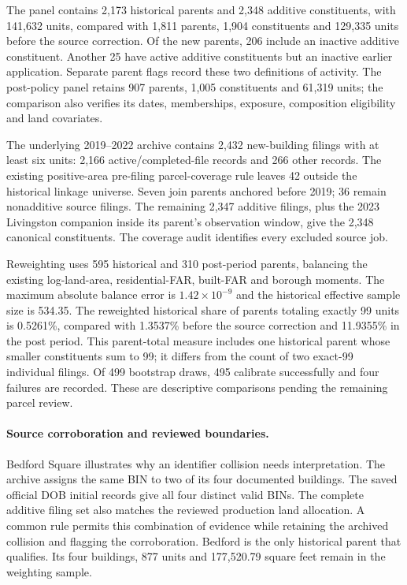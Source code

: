 The panel contains 2,173 historical parents and 2,348 additive constituents,
with 141,632 units, compared with 1,811 parents, 1,904 constituents and
129,335 units before the source correction. Of the new parents, 206 include
an inactive additive constituent. Another 25 have active additive
constituents but an inactive earlier application. Separate parent flags
record these two definitions of activity. The post-policy panel retains
907 parents, 1,005 constituents and 61,319 units; the comparison also verifies
its dates, memberships, exposure, composition eligibility and land covariates.

The underlying 2019--2022 archive contains 2,432 new-building filings with at
least six units: 2,166 active/completed-file records and 266 other records.
The existing positive-area pre-filing parcel-coverage rule leaves 42 outside
the historical linkage universe. Seven join parents anchored before 2019;
36 remain nonadditive source filings. The remaining 2,347 additive filings,
plus the 2023 Livingston companion inside its parent's observation window,
give the 2,348 canonical constituents. The coverage audit identifies every
excluded source job.

Reweighting uses 595 historical and 310 post-period parents, balancing the
existing log-land-area, residential-FAR, built-FAR and borough moments.
The maximum absolute balance error is $1.42\times10^{-9}$ and the historical
effective sample size is 534.35. The reweighted historical share of parents
totaling exactly 99 units is 0.5261\%, compared with 1.3537\% before the source
correction and 11.9355\% in the post period. This parent-total measure includes
one historical parent whose smaller constituents sum to 99; it differs from
the count of two exact-99 individual filings. Of 499 bootstrap draws, 495
calibrate successfully and four failures are recorded. These are descriptive
comparisons pending the remaining parcel review.

\paragraph{Source corroboration and reviewed boundaries.}
Bedford Square illustrates why an identifier collision needs interpretation.
The archive assigns the same BIN to two of its four documented buildings.
The saved official DOB initial records give all four distinct valid BINs.
The complete additive filing set also matches the reviewed production land
allocation. A common rule permits this combination of evidence while
retaining the archived collision and flagging the corroboration. Bedford is
the only historical parent that qualifies. Its four buildings, 877 units and
177,520.79 square feet remain in the weighting sample.

